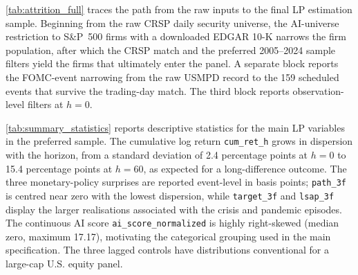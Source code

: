 \begin{table}[!htbp]
\centering
\caption{Final LP estimation sample.}
\label{tab:sample_overview}

\end{table}

\cref{tab:attrition_full} traces the path from the raw inputs to the final LP estimation sample. Beginning from the raw CRSP daily security universe, the AI-universe restriction to S\&P~500 firms with a downloaded EDGAR 10-K narrows the firm population, after which the CRSP match and the preferred 2005--2024 sample filters yield the firms that ultimately enter the panel. A separate block reports the FOMC-event narrowing from the raw USMPD record to the 159 scheduled events that survive the trading-day match. The third block reports observation-level filters at $h=0$.

\begin{table}[!htbp]
\centering
\caption{Sample-attrition funnel: from raw inputs to the LP estimation sample.}
\label{tab:attrition_full}

\end{table}

\cref{tab:summary_statistics} reports descriptive statistics for the main LP variables in the preferred sample. The cumulative log return \texttt{cum\_ret\_h} grows in dispersion with the horizon, from a standard deviation of 2.4 percentage points at $h=0$ to 15.4 percentage points at $h=60$, as expected for a long-difference outcome. The three monetary-policy surprises are reported event-level in basis points; \texttt{path\_3f} is centred near zero with the lowest dispersion, while \texttt{target\_3f} and \texttt{lsap\_3f} display the larger realisations associated with the crisis and pandemic episodes. The continuous AI score \texttt{ai\_score\_normalized} is highly right-skewed (median zero, maximum 17.17), motivating the categorical grouping used in the main specification. The three lagged controls have distributions conventional for a large-cap U.S. equity panel.

\begin{table}[!htbp]
\centering
\caption{Summary statistics for the LP estimation sample.}
\label{tab:summary_statistics}

\end{table}

